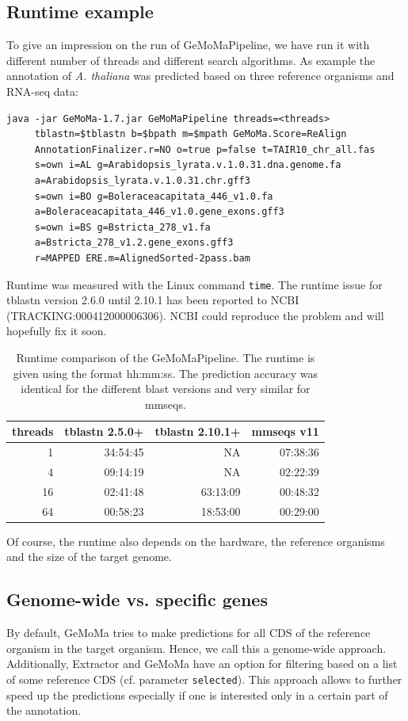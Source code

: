 \documentclass{article}
\begin{document}
\subsection{Runtime example}
To give an impression on the run of GeMoMaPipeline, we have run it with different number of threads and different search algorithms.
As example the annotation of \emph{A. thaliana} was predicted based on three reference organisms and RNA-seq data:
\begin{verbatim}
java -jar GeMoMa-1.7.jar GeMoMaPipeline threads=<threads> 
     tblastn=$tblastn b=$bpath m=$mpath GeMoMa.Score=ReAlign
     AnnotationFinalizer.r=NO o=true p=false t=TAIR10_chr_all.fas 
     s=own i=AL g=Arabidopsis_lyrata.v.1.0.31.dna.genome.fa
     a=Arabidopsis_lyrata.v.1.0.31.chr.gff3 
     s=own i=BO g=Boleraceacapitata_446_v1.0.fa
     a=Boleraceacapitata_446_v1.0.gene_exons.gff3
     s=own i=BS g=Bstricta_278_v1.fa
     a=Bstricta_278_v1.2.gene_exons.gff3
     r=MAPPED ERE.m=AlignedSorted-2pass.bam
\end{verbatim}
Runtime was measured with the Linux command \verb+time+.
The runtime issue for tblastn version 2.6.0 until 2.10.1 has been reported to NCBI (TRACKING:000412000006306). NCBI could reproduce the problem and will hopefully fix it soon.

\begin{table}[ht]\centering
\begin{tabular}{|r||r|r|r|}
\hline
threads	&tblastn 2.5.0+	&tblastn 2.10.1+	&mmseqs v11%
\\
\hline\hline
1	&34:54:45	&NA	&07:38:36\\\hline
4	&09:14:19	&NA	&02:22:39\\\hline
16	&02:41:48	&63:13:09	&00:48:32\\\hline
64	&00:58:23	&18:53:00	&00:29:00\\\hline
\end{tabular}
\caption{
Runtime comparison of the GeMoMaPipeline. The runtime is given using the format hh:mm:ss.
The prediction accuracy was identical for the different blast versions and very similar for mmseqs.
}
\end{table}

Of course, the runtime also depends on the hardware, the reference organisms and the size of the target genome.


\subsection{Genome-wide vs. specific genes}
By default, GeMoMa tries to make predictions for all CDS of the reference organism in the target organism. Hence, we call this a genome-wide approach. Additionally, Extractor and GeMoMa have an option for filtering based on a list of some reference CDS (cf. parameter \texttt{selected}). This approach allows to further speed up the predictions especially if one is interested only in a certain part of the annotation.
\end{document}
